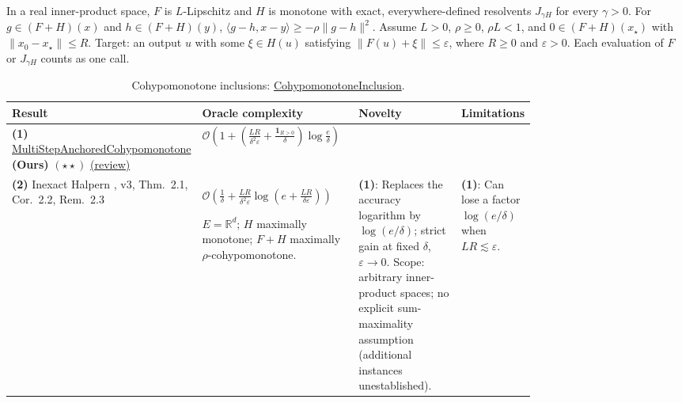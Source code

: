 \begin{table}[tp]
\centering
\caption{Cohypomonotone inclusions: \href{https://github.com/k3nfalt/longtails/blob/main/LongTails/Setups/CohypomonotoneInclusion.lean}{CohypomonotoneInclusion}.}\label{tab:CohypomonotoneInclusion}
\parbox{\linewidth}{\footnotesize In a real inner-product space, $F$ is $L$-Lipschitz and $H$ is monotone with exact, everywhere-defined resolvents $J_{\gamma H}$ for every $\gamma>0$. For $g\in(F+H)(x)$ and $h\in(F+H)(y)$, $\langle g-h,x-y\rangle\ge-\rho\|g-h\|^2$. Assume $L>0$, $\rho\ge0$, $\rho L<1$, and $0\in(F+H)(x_\star)$ with $\|x_0-x_\star\|\le R$. Target: an output $u$ with some $\xi\in H(u)$ satisfying $\|F(u)+\xi\|\le\varepsilon$, where $R\ge0$ and $\varepsilon>0$. Each evaluation of $F$ or $J_{\gamma H}$ counts as one call.}\par\smallskip
\begin{threeparttable}
\footnotesize
\setlength{\tabcolsep}{4pt}\renewcommand{\arraystretch}{1.25}
\begin{tabularx}{\linewidth}{@{}>{\raggedright\arraybackslash}p{0.20\linewidth}>{\raggedright\arraybackslash}p{0.32\linewidth}>{\raggedright\arraybackslash}p{0.25\linewidth}>{\raggedright\arraybackslash}X@{}}
\toprule
\textbf{Result} & \textbf{Oracle complexity} & \textbf{Novelty} & \textbf{Limitations} \\
\midrule
\textbf{(1)} \href{https://github.com/k3nfalt/longtails/blob/main/LongTails/Theorems/MultiStepAnchoredCohypomonotone.lean}{Multi\allowbreak Step\allowbreak Anchored\allowbreak Cohypomonotone} \textbf{(Ours)} $(\star\star)$ \href{https://github.com/k3nfalt/longtails/blob/main/scripts/reviews/MultiStepAnchoredCohypomonotone.md}{(review)}
& $\mathcal{O}\!\left(1+\left(\frac{LR}{\delta^2\varepsilon}+\frac{\mathbf{1}_{R>0}}{\delta}\right)\log\frac{e}{\delta}\right)$ & & \\
\midrule[1.2pt]
\textbf{(2)} Inexact Halpern \citep{cohypAKW2024v3}, v3, Thm.~2.1, Cor.~2.2, Rem.~2.3
& $\mathcal{O}\!\left(\frac1\delta+\frac{LR}{\delta^2\varepsilon}\log\!\left(e+\frac{LR}{\delta\varepsilon}\right)\right)$\par
$E=\mathbb{R}^d$; $H$ maximally monotone; $F+H$ maximally $\rho$-cohypomonotone.
& \textbf{(1)}: Replaces the accuracy logarithm by $\log(e/\delta)$; strict gain at fixed $\delta$, $\varepsilon\to0$. Scope: arbitrary inner-product spaces; no explicit sum-maximality assumption (additional instances unestablished).
& \textbf{(1)}: Can lose a factor $\log(e/\delta)$ when $LR\lesssim\varepsilon$. \\

\end{tabularx}
\end{threeparttable}
\end{table}
